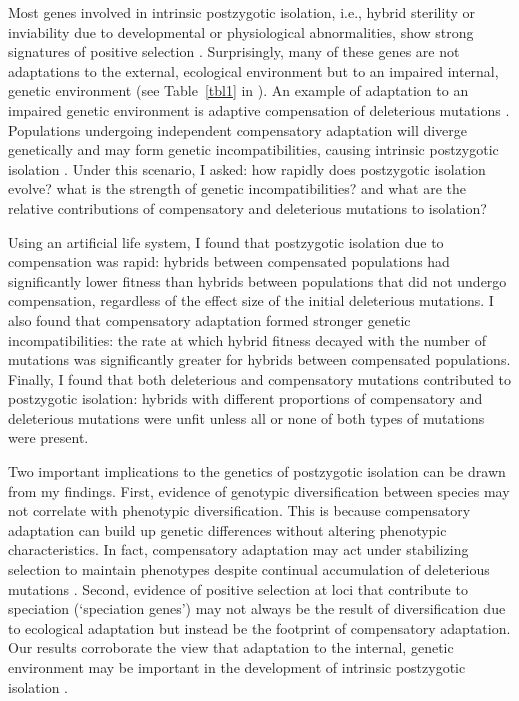 \begin{doublespace}
Most genes involved in intrinsic postzygotic isolation,
i.e., hybrid sterility or inviability
due to developmental or physiological abnormalities,
show strong signatures of positive selection \citep{pre10}.
%
Surprisingly, many of these genes
are not adaptations to the external, ecological environment
but to an impaired internal, genetic environment
(see Table~\ref{tbl1} in \citep{pre10}).
%
An example of adaptation to an impaired genetic environment
is adaptive compensation of deleterious mutations
\citep{har96,bur99,moo00,lev00,mai02,est03,est11}.
%
Populations undergoing independent compensatory adaptation
will diverge genetically
and may form genetic incompatibilities,
causing intrinsic postzygotic isolation
\citep{orr01,kon02,kul04,coy04,lan07,sch09b,pre10}.
%
Under this scenario, I asked:
how rapidly does postzygotic isolation evolve?
what is the strength of genetic incompatibilities?
and what are the relative contributions
of compensatory and deleterious mutations to isolation?



Using an artificial life system,
I found that postzygotic isolation
due to compensation was rapid:
hybrids between compensated populations
had significantly lower fitness
than hybrids between populations that did not undergo compensation,
regardless of the effect size
of the initial deleterious mutations.
%
I also found that compensatory adaptation
formed stronger genetic incompatibilities:
the rate at which hybrid fitness
decayed with the number of mutations
was significantly greater
for hybrids between compensated populations.
%
Finally, I found that both
deleterious and compensatory mutations
contributed to postzygotic isolation:
hybrids with different proportions
of compensatory and deleterious mutations
were unfit unless all or none
of both types of mutations were present.



Two important implications to the genetics of postzygotic isolation
can be drawn from my findings.
%
First, evidence of genotypic diversification between species
may not correlate with phenotypic diversification.
%
This is because compensatory adaptation can build up genetic differences
without altering phenotypic characteristics.
%
In fact, compensatory adaptation may act under stabilizing selection
to maintain phenotypes despite continual accumulation of
deleterious mutations \citep{har96}.
%
Second, evidence of positive selection
at loci that contribute to speciation (`speciation genes')
may not always be the result of diversification
due to ecological adaptation
but instead be the footprint of compensatory adaptation.
%
Our results corroborate the view that
adaptation to the internal, genetic environment
may be important in the development
of intrinsic postzygotic isolation \citep{pre10,pha09}.




\end{doublespace}
